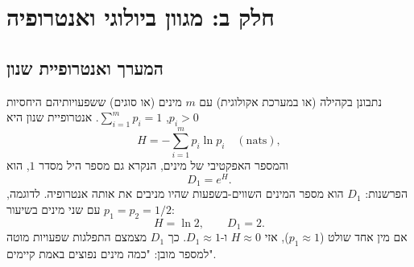 \section{חלק ב: מגוון ביולוגי ואנטרופיה}

\subsection*{המערך ואנטרופיית שנון}
נתבונן בקהילה (או במערכת אקולוגית) עם \(m\) מינים (או סוגים) ששפעויותיהם היחסיות \(p_i>0\), \(\sum_{i=1}^{m}p_i=1\). אנטרופיית שנון היא
\begin{equation}\label{eq:he-bio-shannon}
H=-\sum_{i=1}^{m}p_i\ln p_i \quad (\text{nats}),
\end{equation}
והמספר האפקטיבי של מינים, הנקרא גם מספר היל מסדר \(1\), הוא
\begin{equation}\label{eq:he-bio-D1}
D_1=e^{H}.
\end{equation}
הפרשנות: \(D_1\) הוא מספר המינים השווים-בשפעות שהיו מניבים את אותה אנטרופיה. לדוגמה, עם שני מינים בשיעור \(p_1=p_2=1/2\):
\begin{equation}\label{eq:he-bio-two-species}
H=\ln 2,\qquad D_1=2.
\end{equation}
אם מין אחד שולט (\(p_1\approx 1\)), אזי \(H\approx 0\) ו-\(D_1\approx 1\). כך \(D_1\) מצמצם התפלגות שפעויות מוטה למספר מובן: "כמה מינים נפוצים באמת קיימים".

